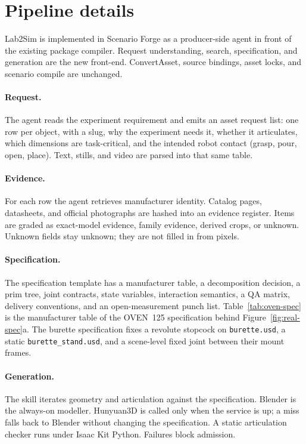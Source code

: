 \section{Pipeline details}
\label{app:pipeline}

Lab2Sim is implemented in Scenario Forge as a producer-side agent in front of
the existing package compiler. Request understanding, search, specification,
and generation are the new front-end. ConvertAsset, source bindings, asset
locks, and scenario compile are unchanged.

\paragraph{Request.}
The agent reads the experiment requirement and emits an asset request list:
one row per object, with a slug, why the experiment needs it, whether it
articulates, which dimensions are task-critical, and the intended robot
contact (grasp, pour, open, place). Text, stills, and video are parsed into
that same table.

\paragraph{Evidence.}
For each row the agent retrieves manufacturer identity. Catalog pages,
datasheets, and official photographs are hashed into an evidence register.
Items are graded as exact-model evidence, family evidence, derived crops, or
unknown. Unknown fields stay unknown; they are not filled in from pixels.

\paragraph{Specification.}
The specification template has a manufacturer table, a decomposition
decision, a prim tree, joint contracts, state variables, interaction
semantics, a QA matrix, delivery conventions, and an open-measurement punch
list. Table~\ref{tab:oven-spec} is the manufacturer table of the OVEN~125
specification behind Figure~\ref{fig:real-spec}a. The burette specification
fixes a revolute stopcock on \texttt{burette.usd}, a static
\texttt{burette\_stand.usd}, and a scene-level fixed joint between their mount
frames.

\paragraph{Generation.}
The skill iterates geometry and articulation against the specification.
Blender is the always-on modeller. Hunyuan3D is called only when the service
is up; a miss falls back to Blender without changing the specification. A
static articulation checker runs under Isaac Kit Python. Failures block
admission.

